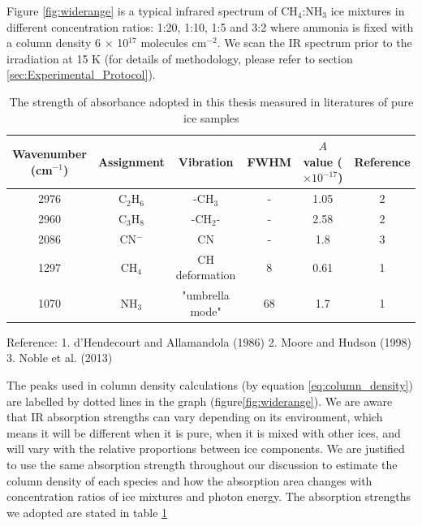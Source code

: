 Figure \ref{fig:widerange} is a typical infrared spectrum of CH$_4$:NH$_3$ ice mixtures in different concentration ratios: 1:20, 1:10, 1:5 and 3:2 where ammonia is fixed with a column density 6 $\times$ 10$^{17}$ molecules cm$^{-2}$. We scan the IR spectrum prior to the irradiation at 15 K (for details of methodology, please refer to section \ref{sec:Experimental_Protocol}).\\

\begin{table}[htbp]
\caption{The strength of absorbance adopted in this thesis measured in literatures of pure ice samples}
\label{tab:Absorbance}
\begin{tabular}{cccccc}
\hline
\hline
Wavenumber (cm$^{-1}$) & Assignment  & Vibration & FWHM & $A$ value ($\times 10^{-17}$) & Reference \\
\hline
2976 &  C$_2$H$_6$ & -CH$_3$ & - & 1.05 & 2 \\
2960 & C$_3$H$_8$ & -CH$_2$- & - & 2.58 & 2 \\
2086 & CN$^-$ & CN & - & 1.8 & 3 \\
1297 & CH$_4$ & CH deformation & 8 & 0.61 & 1 \\
1070 & NH$_3$ & "umbrella mode" & 68 & 1.7 & 1 \\
\hline
\end{tabular}
Reference: 1. d'Hendecourt and Allamandola (1986)\cite{d1986time} 2. Moore and Hudson (1998)\cite{moore1998infrared} 3. Noble et al. (2013) \cite{noble2012thermal}
\end{table}

The peaks used in column density calculations (by equation \ref{eq:column_density}) are labelled by dotted lines in the graph (figure\ref{fig:widerange}). We are aware that IR absorption strengths can vary depending on its environment, which means it will be different when it is pure, when it is mixed with other ices, and will vary with the relative proportions between ice components. We are justified to use the same absorption strength throughout our discussion to estimate the column density of each species and how the absorption area changes with concentration ratios of ice mixtures and photon energy. The absorption strengths we adopted are stated in table \ref{tab:Absorbance} \\

